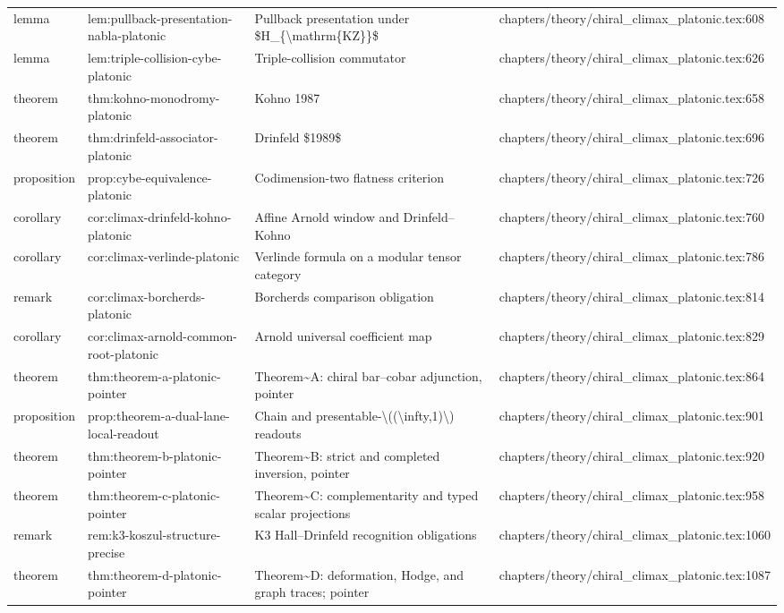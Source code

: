 \documentclass[11pt]{article}
\begin{document}
\begin{longtable}{L{0.10\textwidth}L{0.26\textwidth}L{0.42\textwidth}L{0.22\textwidth}}
lemma & lem:pullback-presentation-nabla-platonic & Pullback presentation under \$H\_\{\textbackslash{}mathrm\{KZ\}\}\$ & chapters/theory/chiral\_climax\_platonic.tex:608\\
lemma & lem:triple-collision-cybe-platonic & Triple-collision commutator & chapters/theory/chiral\_climax\_platonic.tex:626\\
theorem & thm:kohno-monodromy-platonic & Kohno 1987 & chapters/theory/chiral\_climax\_platonic.tex:658\\
theorem & thm:drinfeld-associator-platonic & Drinfeld \$1989\$ & chapters/theory/chiral\_climax\_platonic.tex:696\\
proposition & prop:cybe-equivalence-platonic & Codimension-two flatness criterion & chapters/theory/chiral\_climax\_platonic.tex:726\\
corollary & cor:climax-drinfeld-kohno-platonic & Affine Arnold window and Drinfeld--Kohno & chapters/theory/chiral\_climax\_platonic.tex:760\\
corollary & cor:climax-verlinde-platonic & Verlinde formula on a modular tensor category & chapters/theory/chiral\_climax\_platonic.tex:786\\
remark & cor:climax-borcherds-platonic & Borcherds comparison obligation & chapters/theory/chiral\_climax\_platonic.tex:814\\
corollary & cor:climax-arnold-common-root-platonic & Arnold universal coefficient map & chapters/theory/chiral\_climax\_platonic.tex:829\\
theorem & thm:theorem-a-platonic-pointer & Theorem\textasciitilde{}A: chiral bar--cobar adjunction, pointer & chapters/theory/chiral\_climax\_platonic.tex:864\\
proposition & prop:theorem-a-dual-lane-local-readout & Chain and presentable-\textbackslash{}((\textbackslash{}infty,1)\textbackslash{}) readouts & chapters/theory/chiral\_climax\_platonic.tex:901\\
theorem & thm:theorem-b-platonic-pointer & Theorem\textasciitilde{}B: strict and completed inversion, pointer & chapters/theory/chiral\_climax\_platonic.tex:920\\
theorem & thm:theorem-c-platonic-pointer & Theorem\textasciitilde{}C: complementarity and typed scalar projections & chapters/theory/chiral\_climax\_platonic.tex:958\\
remark & rem:k3-koszul-structure-precise & K3 Hall--Drinfeld recognition obligations & chapters/theory/chiral\_climax\_platonic.tex:1060\\
theorem & thm:theorem-d-platonic-pointer & Theorem\textasciitilde{}D: deformation, Hodge, and graph traces; pointer & chapters/theory/chiral\_climax\_platonic.tex:1087\\

\end{longtable}
\end{document}
